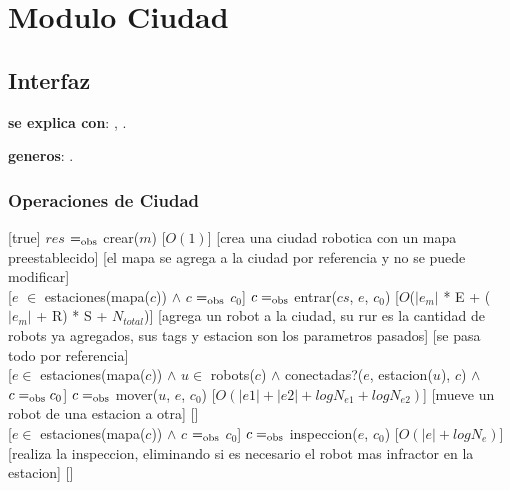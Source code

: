  
\section{Modulo Ciudad}


\subsection{Interfaz}

  \textbf{se explica con}: , .

  \textbf{generos}:  .



  \subsubsection{Operaciones de Ciudad}

  [true] %
  {$res$ $=_{\mathrm{obs}}$ crear($m$)}
  [$O(1)$]
  [crea una ciudad robotica con un mapa preestablecido]
  [el mapa se agrega a la ciudad por referencia y no se puede modificar]\\ 

  [$e$ $\in$ estaciones(mapa($c$)) $\land$ $c$ $=_{\mathrm{obs}}$ $c_0$]
  {$c =_{\mathrm{obs}}$ entrar($cs$, $e$, $c_0$)}
  [$O$($|e_m|$ * E + ($|e_m|$ + R) * S + $N_{total}$)]
  [agrega un robot a la ciudad, su rur es la cantidad de robots ya agregados, sus tags y estacion son los parametros pasados]
  [se pasa todo por referencia] \\  

  [$e \in$ estaciones(mapa($c$)) $\land$
  $u \in$ robots($c$) $\land$ 
  conectadas?($e$, estacion($u$), $c$) $\land$
  $c =_{\mathrm{obs}} c_0$]
  {$c =_{\mathrm{obs}}$ mover($u$, $e$, $c_0$)}
  [$O(|e1| + |e2| + log N_{e1} + log N_{e2} )$] %
  [mueve un robot de una estacion a otra]
  [] \\  

  [$e \in$ estaciones(mapa($c$)) $\land$ $c$ $=_{\mathrm{obs}}$ $c_0$]
  {$c =_{\mathrm{obs}}$ inspeccion($e$, $c_0$)}
  [$O(|e| + log N_e)$]
  [realiza la inspeccion, eliminando si es necesario el robot mas infractor en la estacion]
  [] \\  

